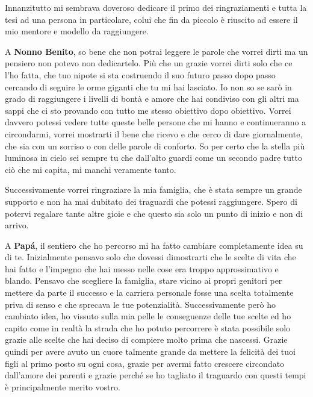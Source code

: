 \documentclass[cucitura%
,12pt%
]{toptesi}
\begin{document}
Innanzitutto mi sembrava doveroso dedicare il primo dei ringraziamenti e tutta la tesi ad una persona in particolare, colui che fin da piccolo è riuscito ad essere il mio mentore e modello da raggiungere.

A \textbf{Nonno Benito}, so bene che non potrai leggere le parole che vorrei dirti ma un pensiero non potevo non dedicartelo. Più che un grazie vorrei dirti solo che ce l’ho fatta, che tuo nipote si sta costruendo il suo futuro passo dopo passo cercando di seguire le orme giganti che tu mi hai lasciato. 
Io non so se sarò in grado di raggiungere i livelli di bontà e amore che hai condiviso con gli altri ma sappi che ci sto provando con tutto me stesso obiettivo dopo obiettivo. Vorrei davvero potessi vedere tutte queste belle persone che mi hanno e continueranno a circondarmi, vorrei mostrarti il bene
che ricevo e che cerco di dare giornalmente, che sia con un sorriso o con delle parole di conforto. So per certo che la stella più luminosa in cielo sei sempre tu che dall’alto guardi come un secondo padre tutto ciò che mi capita, mi manchi veramente tanto.

Successivamente vorrei ringraziare la mia famiglia, che è stata sempre un grande supporto e non ha mai dubitato dei traguardi che potessi raggiungere. Spero di potervi regalare tante altre gioie e che questo sia solo un punto di inizio e non di arrivo.

A \textbf{Papá}, il sentiero che ho percorso mi ha fatto cambiare completamente idea su di te. Inizialmente pensavo solo che dovessi dimostrarti che le scelte di vita che hai fatto e l’impegno che hai messo nelle cose era troppo approssimativo e blando. Pensavo che scegliere la famiglia, stare vicino ai propri genitori per mettere da parte il successo e la carriera personale fosse una scelta totalmente priva di senso e che sprecava le tue potenzialità. Successivamente però ho cambiato idea, ho vissuto sulla mia pelle le conseguenze delle tue scelte ed ho capito come in realtà la strada che ho potuto percorrere è stata possibile solo grazie alle scelte che hai deciso di compiere molto prima che nascessi. Grazie quindi per avere avuto un cuore talmente grande da mettere la felicità dei tuoi figli al primo posto su ogni cosa, grazie per avermi fatto crescere circondato dall’amore dei parenti e grazie perché se ho tagliato il traguardo con questi tempi è principalmente merito vostro.
\end{document}
